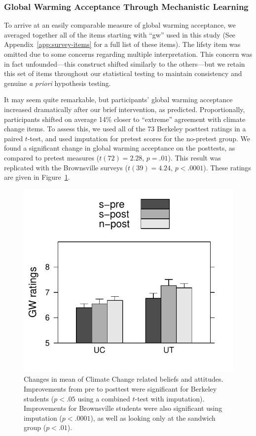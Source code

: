 \subsubsection{Global Warming Acceptance Through Mechanistic Learning}

To arrive at an easily comparable measure of global warming acceptance, we
averaged together all of the items starting with “\textsf{gw}” used in this
study (See Appendix~\ref{app:survey-items} for a full list of these items).
The \textsf{lifsty} item was omitted due to some concerns regarding multiple
interpretation. This concern was in fact unfounded---this construct shifted
similarly to the others---but we retain this set of items throughout our
statistical testing to maintain consistency and genuine \emph{a priori}
hypothesis testing. 

It may seem quite remarkable, but participants’ global warming acceptance
increased dramatically after our brief intervention, as predicted.
Proportionally, participants shifted on average 14\% closer to ``extreme''
agreement with climate change items. To assess this, we used all of the 73
Berkeley posttest ratings in a paired $t$-test, and used imputation for pretest
scores for the no-pretest group. We found a significant change in global warming
acceptance on the posttests, as compared to pretest measures ($t(72) = 2.28$, $p
= .01$). This result was replicated with the Brownsville surveys ($t(39) =
4.24$, $p < .0001$). These ratings are given in
Figure~\ref{fig:class-gw-ratings}.

\begin{figure}
    \centering
    \includegraphics{class-gw-ratings.pdf}
    \caption{Changes in mean of Climate Change related beliefs and attitudes.
        Improvements from pre to posttest were significant for
        Berkeley students ($p < .05$ using a combined $t$-test with imputation).
        Improvements for Brownsville students were also significant using
        imputation ($p < .0001$), as well as looking only at the sandwich group
        ($p < .01$).}
    \label{fig:class-gw-ratings}
\end{figure}

